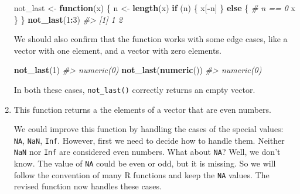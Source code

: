 \documentclass[]{book}
\newenvironment{Shaded}{\begin{snugshade}}{\end{snugshade}}
\newcommand{\CommentTok}[1]{\textcolor[rgb]{0.56,0.35,0.01}{\textit{#1}}}
\newcommand{\ControlFlowTok}[1]{\textcolor[rgb]{0.13,0.29,0.53}{\textbf{#1}}}
\newcommand{\DecValTok}[1]{\textcolor[rgb]{0.00,0.00,0.81}{#1}}
\newcommand{\KeywordTok}[1]{\textcolor[rgb]{0.13,0.29,0.53}{\textbf{#1}}}
\newcommand{\NormalTok}[1]{#1}
\newcommand{\OperatorTok}[1]{\textcolor[rgb]{0.81,0.36,0.00}{\textbf{#1}}}
\newcommand{\StringTok}[1]{\textcolor[rgb]{0.31,0.60,0.02}{#1}}
\theoremstyle{plain}
\theoremstyle{remark}
\theoremstyle{definition}
\theoremstyle{definition}
\theoremstyle{definition}
\theoremstyle{remark}
\begin{document}
\begin{enumerate}
\begin{Shaded}
\begin{Highlighting}[]
\NormalTok{not_last <-}\StringTok{ }\ControlFlowTok{function}\NormalTok{(x) \{}
\NormalTok{  n <-}\StringTok{ }\KeywordTok{length}\NormalTok{(x)}
  \ControlFlowTok{if}\NormalTok{ (n) \{}
\NormalTok{    x[}\OperatorTok{-}\NormalTok{n]}
\NormalTok{  \} }\ControlFlowTok{else}\NormalTok{ \{}
    \CommentTok{# n == 0}
\NormalTok{    x}
\NormalTok{  \}}
\NormalTok{\}}
\KeywordTok{not_last}\NormalTok{(}\DecValTok{1}\OperatorTok{:}\DecValTok{3}\NormalTok{)}
\CommentTok{#> [1] 1 2}
\end{Highlighting}
\end{Shaded}

  We should also confirm that the function works with some edge cases,
  like a vector with one element, and a vector with zero elements.

\begin{Shaded}
\begin{Highlighting}[]
\KeywordTok{not_last}\NormalTok{(}\DecValTok{1}\NormalTok{)}
\CommentTok{#> numeric(0)}
\KeywordTok{not_last}\NormalTok{(}\KeywordTok{numeric}\NormalTok{())}
\CommentTok{#> numeric(0)}
\end{Highlighting}
\end{Shaded}

  In both these cases, \texttt{not\_last()} correctly returns an empty
  vector.
\item
  This function returns a the elements of a vector that are even
  numbers.

\begin{Shaded}
\end{Shaded}

  We could improve this function by handling the cases of the special
  values: \texttt{NA}, \texttt{NaN}, \texttt{Inf}. However, first we
  need to decide how to handle them. Neither \texttt{NaN} nor
  \texttt{Inf} are considered even numbers. What about \texttt{NA}?
  Well, we don't know. The value of \texttt{NA} could be even or odd,
  but it is missing. So we will follow the convention of many R
  functions and keep the \texttt{NA} values. The revised function now
  handles these cases.


\end{enumerate}
\end{document}
